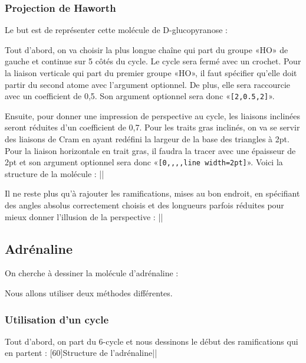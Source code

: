 \documentclass[10pt,french]{article}
\makeatletter
\newcommand\make@car@active[1]{%
	\catcode`#1\active
	\begingroup
		\lccode`\~`#1\relax
		\lowercase{\endgroup\def~}%
}
\newif\if@exstar
\newcommand\exemple{%
	\begingroup
	\parskip\z@
	\@makeother\;\@makeother\!\@makeother\?\@makeother\:%
	\@ifstar{\@exstartrue\exemple@}{\@exstarfalse\exemple@}}
\newcommand\exemple@[2][65]{%
	\medbreak\noindent
	\begingroup
		\let\do\@makeother\dospecials
		\make@car@active\ { {}}%
		\make@car@active\^^M{\par\leavevmode}%
		\make@car@active\^^I{\space\space}%
		\make@car@active\,{\leavevmode\kern\z@\string,}%
		\make@car@active\-{\leavevmode\kern\z@\string-}%
		\make@car@active\>{\leavevmode\kern\z@\string>}%
		\make@car@active\<{\leavevmode\kern\z@\string<}%
		\exemple@@{#1}{#2}%
}
\newcommand\exemple@@[3]{%
	\def\@tempa##1#3{\exemple@@@{#1}{#2}{##1}}%
	\@tempa
}
\newcommand\exemple@@@[3]{%
	\xdef\the@code{#3}%
	\endgroup
	\if@exstar
		\begingroup
			\fboxrule0.4pt
			\let\breakboxparindent\z@
			\def\bkvz@bottom{\hrule\@height\fboxrule}%
			\let\bkvz@before@breakbox\relax
			\def\bkvz@set@linewidth{\advance\linewidth\dimexpr-2\fboxrule-2\fboxsep}%
			\def\bkvz@left{\vrule\@width\fboxrule\hskip\fboxsep}%
			\def\bkvz@right{\hskip\fboxsep\vrule\@width\fboxrule}%
			\def\bkvz@top{\hbox to \hsize{%
				\vrule\@width\fboxrule\@height\fboxrule
				\leaders\bkvz@bottom\hfill
				\sffamily
				\fboxsep\z@
				\colorbox{black}{\kern0.25em\color{white}\footnotesize\lower0.5ex\hbox{\strut#2}\kern0.25em}%
				\leaders\bkvz@bottom\hfill
				\vrule\@width\fboxrule\@height\fboxrule}}%
			\breakbox
				\kern.5ex\relax
				\ttfamily\footnotesize\the@code\par
				\normalfont
				\kern3pt
				\hrule height0.1pt width\linewidth depth0.1pt
				\vskip5pt
				\rightskip0pt plus 1fill
				\everypar{{\color{lightgray}\rlap{\vrule height0.1pt width\linewidth depth0.1pt}}\hskip0pt plus 1fill}%
				\newlinechar`\^^M\everyeof{\noexpand}\scantokens{#3}\par
			\endbreakbox
		\endgroup
	\else
		\vskip0.5ex
		\boxput*(0,1)
			{\fboxsep\z@
			\hbox{\sffamily\colorbox{black}{\leavevmode\kern0.25em{\color{white}\footnotesize\strut#2}\kern0.25em}}%
			}%
			{\fboxsep5pt
			\fbox{%
				$\vcenter{\hsize\dimexpr0.#1\linewidth-\fboxsep-\fboxrule\relax
					\kern5pt\parskip0pt \ttfamily\footnotesize\the@code}%
				\vcenter{\kern5pt\hsize\dimexpr\linewidth-0.#1\linewidth-\fboxsep-\fboxrule\relax
					\everypar{{\color{lightgray}\rlap{\vrule height0.1pt width\dimexpr\linewidth-0.#1\linewidth-\fboxsep-\fboxrule depth0.1pt}}}%
					\footnotesize\newlinechar`\^^M\everyeof{\noexpand}\scantokens{#3}}$%
				}%
			}%
	\fi
	\medbreak
	\endgroup
}
\makeatother
\begin{document}
\subsubsection{Projection de Haworth}
Le but est de représenter cette molécule de D-glucopyranose :

Tout d'abord, on va choisir la plus longue chaîne qui part du groupe «HO» de gauche et continue sur 5 côtés du cycle. Le cycle sera fermé avec un crochet. Pour la liaison verticale qui part du premier groupe «HO», il faut spécifier qu'elle doit partir du second atome avec l'argument optionnel. De plus, elle sera raccourcie avec un coefficient de 0,5. Son argument optionnel sera donc «\verb/[2,0.5,2]/».

Ensuite, pour donner une impression de perspective au cycle, les liaisons inclinées seront réduites d'un coefficient de 0,7. Pour les traits gras inclinés, on va se servir des liaisons de Cram en ayant redéfini la largeur de la base des triangles à 2pt. Pour la liaison horizontale en trait gras, il faudra la tracer  avec une épaisseur de 2pt et son argument optionnel sera donc «\verb/[0,,,,line width=2pt]/». Voici la structure de la molécule :
\exemple{Structure}||

Il ne reste plus qu'à rajouter les ramifications, mises au bon endroit, en spécifiant des angles absolus correctement choisis et des longueurs parfois réduites pour mieux donner l'illusion de la perspective :
\exemple{Projection de Haworth}||

\subsection{Adrénaline}
On cherche à dessiner la molécule d'adrénaline :

Nous allons utiliser deux méthodes différentes.

\subsubsection{Utilisation d'un cycle}
Tout d'abord, on part du 6-cycle et nous dessinons le début des ramifications qui en partent :
\exemple[60]{Structure de l'adrénaline}||
\end{document}
